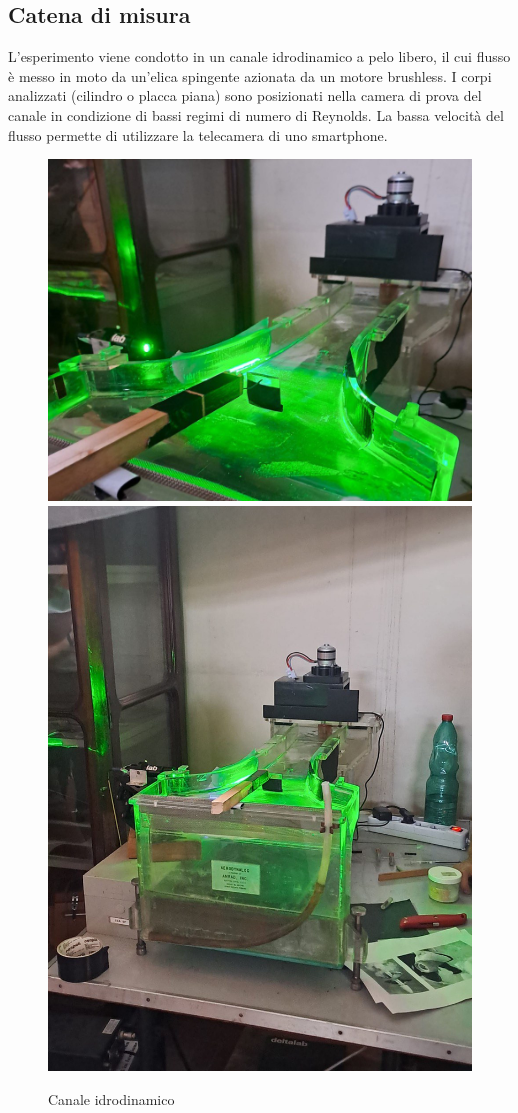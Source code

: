 \subsection{Catena di misura}
L'esperimento viene condotto in un canale idrodinamico a pelo libero, il cui flusso è messo in moto da un'elica spingente azionata da un motore brushless. I corpi analizzati (cilindro o placca piana) sono posizionati nella camera di prova del canale in condizione di bassi regimi di numero di Reynolds. La bassa velocità del flusso permette di utilizzare la telecamera di uno smartphone.
\begin{figure}[H]
    \centering
    \includegraphics[height=.46\textwidth]{images/11/piv1.jpg}
    \includegraphics[height=.46\textwidth]{images/11/piv2.jpg}
    \caption{Canale idrodinamico}
\end{figure}

